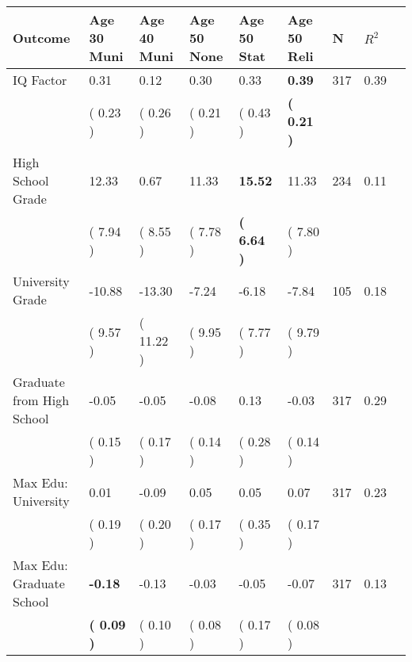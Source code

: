 \begin{tabular}{L{6.2cm} C{1.8cm} C{1.8cm} C{1.8cm} C{1.8cm} C{1.8cm} C{1.8cm} C{0.3cm} C{0.3cm}}
\toprule
 \textbf{Outcome} & \textbf{Age 30 Muni} & \textbf{Age 40 Muni} & \textbf{Age 50 None} & \textbf{Age 50 Stat} & \textbf{Age 50 Reli} & \textbf{N} & \textbf{$ R^2$} \\
\midrule
IQ Factor &      0.31 &      0.12 &      0.30 &      0.33 & \textbf{     0.39}  & 317 &       0.39 \\ 
 & (     0.23 ) & (     0.26 ) & (     0.21 ) & (     0.43 ) & \textbf{(     0.21 )}  & \\
High School Grade &     12.33 &      0.67 &     11.33 & \textbf{    15.52} &     11.33  & 234 &       0.11 \\ 
 & (     7.94 ) & (     8.55 ) & (     7.78 ) & \textbf{(     6.64 )} & (     7.80 )  & \\
University Grade &    -10.88 &    -13.30 &     -7.24 &     -6.18 &     -7.84  & 105 &       0.18 \\ 
 & (     9.57 ) & (    11.22 ) & (     9.95 ) & (     7.77 ) & (     9.79 )  & \\
Graduate from High School &     -0.05 &     -0.05 &     -0.08 &      0.13 &     -0.03  & 317 &       0.29 \\ 
 & (     0.15 ) & (     0.17 ) & (     0.14 ) & (     0.28 ) & (     0.14 )  & \\
Max Edu: University &      0.01 &     -0.09 &      0.05 &      0.05 &      0.07  & 317 &       0.23 \\ 
 & (     0.19 ) & (     0.20 ) & (     0.17 ) & (     0.35 ) & (     0.17 )  & \\
Max Edu: Graduate School & \textbf{    -0.18} &     -0.13 &     -0.03 &     -0.05 &     -0.07  & 317 &       0.13 \\ 
 & \textbf{(     0.09 )} & (     0.10 ) & (     0.08 ) & (     0.17 ) & (     0.08 )  & \\
\bottomrule
\end{tabular}
